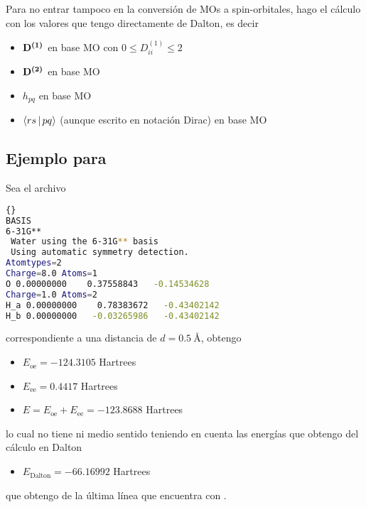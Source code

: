 Para no entrar tampoco en la conversión de MOs a spin-orbitales, hago el cálculo
con los valores que tengo directamente de Dalton, es decir
\begin{itemize}
    \item $\boldsymbol{\mathrm{D^{(1)}}}$ en base MO con $0 \le D^{(1)}_{ii} \le 2$
    \item $\boldsymbol{\mathrm{D^{(2)}}}$ en base MO
    \item $h_{pq}$ en base MO
    \item $\Braket{rs | pq}$ (aunque escrito en notación Dirac) en base MO
\end{itemize}

\subsection{Ejemplo para }
Sea el archivo 
\begin{lstlisting}[language=bash]{}
BASIS
6-31G**
 Water using the 6-31G** basis
 Using automatic symmetry detection.
Atomtypes=2
Charge=8.0 Atoms=1
O 0.00000000    0.37558843   -0.14534628
Charge=1.0 Atoms=2
H_a 0.00000000    0.78383672   -0.43402142
H_b 0.00000000   -0.03265986   -0.43402142
\end{lstlisting}
correspondiente a una distancia  de $d = 0.5\  \text{\AA}$, obtengo
\begin{itemize}
    \item $E_{\text{oe}} = -124.3105$ Hartrees
    \item $E_{\text{ee}} = 0.4417$ Hartrees
    \item $E = E_{\text{oe}} + E_{\text{ee}} = -123.8688$ Hartrees
\end{itemize}
lo cual no tiene ni medio sentido teniendo en cuenta las energías que obtengo
del cálculo en Dalton
\begin{itemize}
    \item $E_{\text{Dalton}} = -66.16992$ Hartrees
\end{itemize}
que obtengo de la última línea que encuentra con .

